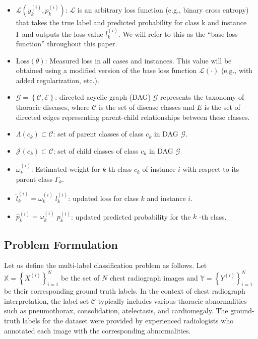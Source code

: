 \documentclass[preprint,3p,times, review]{elsarticle}
\begin{document}
\begin{itemize}
    \item  $\mathcal{L} \left(y_k^{(i)},p_k^{(i)}\right) $: $\mathcal{L} $ is an arbitrary loss function (e.g., binary cross entropy) that takes the true label and predicted probability for class k and instance I~and outputs the loss value $l_k^{(i)} $. We will refer to this as the ``base loss function'' throughout this paper.

    \item  $\text{Loss}(\theta) $: Measured loss in all cases and instances. This value will be obtained using a modified version of the base loss function $\mathcal{L}(\cdot) $ (e.g., with added regularization, etc.).

    \item  $\mathcal{G}=\left\{\mathcal{C},\mathcal{E}\right\} $: directed acyclic graph (DAG) $\mathcal{G} $ represents the taxonomy of thoracic diseases, where $\mathcal{C} $ is the set of disease classes and $E $ is the set of directed edges representing parent-child relationships between these classes.

    \item  $\Lambda(c_k)\subset \mathcal{C}$: set of parent classes of class $c_k $ in DAG $\mathcal{G} $.

    \item  $\mathcal{J}(c_k) \subset \mathcal{C}$: set of child classes of class $c_k $ in DAG $\mathcal{G} $

    \item  $\omega_k^{(i)} $: Estimated weight for $k$-th class $c_k $ of instance $i $ with respect to its parent class $\Gamma_k $.

    \item  ${\widehat l}_k^{(i)} = \omega_k^{(i)} \; l_k^{(i)} $: updated loss for class $k $ and instance $i $.

    \item  ${\widehat p}_k^{(i)}=\omega_k^{(i)}\;p_k^{(i)} $: updated predicted probability for the $k $ -th class.

\end{itemize}


\subsection{Problem Formulation}

Let us define the multi-label classification problem as follows. Let $\mathbb{X} = \left\{X^{(i)}\right\}_{i=1}^{N} $ be the set of $N $ chest radiograph images and $\mathbb{Y} = \left\{Y^{(i)}\right\}_{i=1}^{N} $ be their corresponding ground truth labels. In the context of chest radiograph interpretation, the label set $\mathcal{C} $ typically includes various thoracic abnormalities such as pneumothorax, consolidation, atelectasis, and cardiomegaly. The ground-truth labels for the dataset were provided by experienced radiologists who annotated each image with the corresponding abnormalities.
\end{document}
